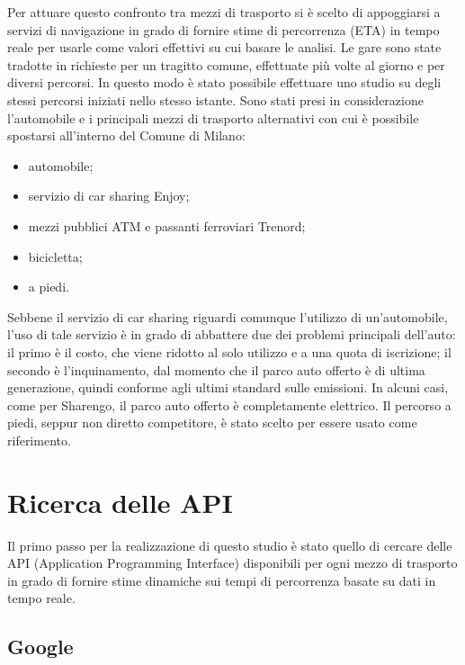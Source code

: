 Per attuare questo confronto tra mezzi di trasporto si è scelto di appoggiarsi a servizi di navigazione in grado di fornire stime di percorrenza (ETA) in tempo reale per usarle come valori effettivi su cui basare le analisi. Le gare sono state tradotte in richieste per un tragitto comune, effettuate più volte al giorno e per diversi percorsi. In questo modo è stato possibile effettuare uno studio su degli stessi percorsi iniziati nello stesso istante. Sono stati presi in considerazione l'automobile e i principali mezzi di trasporto alternativi con cui è possibile spostarsi all'interno del Comune di Milano:
\begin{itemize}
	\item automobile;
	\item servizio di car sharing Enjoy;
	\item mezzi pubblici ATM e passanti ferroviari Trenord;
	\item bicicletta;
	\item a piedi.
\end{itemize}
Sebbene il servizio di car sharing riguardi comunque l'utilizzo di un'automobile, l'uso di tale servizio è in grado di abbattere due dei problemi principali dell'auto: il primo è il costo, che viene ridotto al solo utilizzo e a una quota di iscrizione; il secondo è l'inquinamento, dal momento che il parco auto offerto è di ultima generazione, quindi conforme agli ultimi standard sulle emissioni. In alcuni casi, come per Sharengo, il parco auto offerto è completamente elettrico. Il percorso a piedi, seppur non diretto competitore, è stato scelto per essere usato come riferimento.

\section{Ricerca delle API}

Il primo passo per la realizzazione di questo studio è stato quello di cercare delle API (Application Programming Interface) disponibili per ogni mezzo di trasporto in grado di fornire stime dinamiche sui tempi di percorrenza basate su dati in tempo reale.

\subsection{Google}

